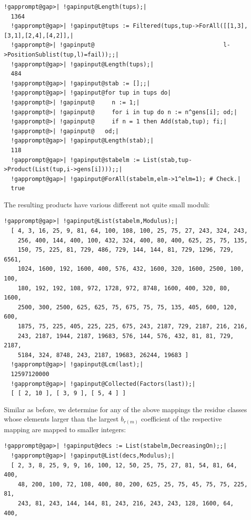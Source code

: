 \documentclass[a4paper,11pt]{report}
\begin{document}
{{\begin{Verbatim}[commandchars=!@|,fontsize=\small,frame=single,label=Example]
  !gapprompt@gap>| !gapinput@Length(tups);|
  1364
  !gapprompt@gap>| !gapinput@tups := Filtered(tups,tup->ForAll([[1,3],[3,1],[2,4],[4,2]],|
  !gapprompt@>| !gapinput@                                     l->PositionSublist(tup,l)=fail));;|
  !gapprompt@gap>| !gapinput@Length(tups);|
  484
  !gapprompt@gap>| !gapinput@stab := [];;|
  !gapprompt@gap>| !gapinput@for tup in tups do|
  !gapprompt@>| !gapinput@     n := 1;|
  !gapprompt@>| !gapinput@     for i in tup do n := n^gens[i]; od;|
  !gapprompt@>| !gapinput@     if n = 1 then Add(stab,tup); fi;|
  !gapprompt@>| !gapinput@   od;|
  !gapprompt@gap>| !gapinput@Length(stab);|
  118
  !gapprompt@gap>| !gapinput@stabelm := List(stab,tup->Product(List(tup,i->gens[i])));;|
  !gapprompt@gap>| !gapinput@ForAll(stabelm,elm->1^elm=1); # Check.|
  true
\end{Verbatim}
 The resulting products have various different not quite small moduli: 
\begin{Verbatim}[commandchars=!@|,fontsize=\small,frame=single,label=Example]
  !gapprompt@gap>| !gapinput@List(stabelm,Modulus);|
  [ 4, 3, 16, 25, 9, 81, 64, 100, 108, 100, 25, 75, 27, 243, 324, 243, 
    256, 400, 144, 400, 100, 432, 324, 400, 80, 400, 625, 25, 75, 135, 
    150, 75, 225, 81, 729, 486, 729, 144, 144, 81, 729, 1296, 729, 6561, 
    1024, 1600, 192, 1600, 400, 576, 432, 1600, 320, 1600, 2500, 100, 100, 
    180, 192, 192, 108, 972, 1728, 972, 8748, 1600, 400, 320, 80, 1600, 
    2500, 300, 2500, 625, 625, 75, 675, 75, 75, 135, 405, 600, 120, 600, 
    1875, 75, 225, 405, 225, 225, 675, 243, 2187, 729, 2187, 216, 216, 
    243, 2187, 1944, 2187, 19683, 576, 144, 576, 432, 81, 81, 729, 2187, 
    5184, 324, 8748, 243, 2187, 19683, 26244, 19683 ]
  !gapprompt@gap>| !gapinput@Lcm(last);|
  12597120000
  !gapprompt@gap>| !gapinput@Collected(Factors(last));|
  [ [ 2, 10 ], [ 3, 9 ], [ 5, 4 ] ]
\end{Verbatim}
 Similar as before, we determine for any of the above mappings the residue
classes whose elements larger than the largest $b_{r(m)}$ \texttt{} coefficient of the respective mapping are mapped to
smaller integers: 
\begin{Verbatim}[commandchars=!@|,fontsize=\small,frame=single,label=Example]
  !gapprompt@gap>| !gapinput@decs := List(stabelm,DecreasingOn);;|
  !gapprompt@gap>| !gapinput@List(decs,Modulus);|
  [ 2, 3, 8, 25, 9, 9, 16, 100, 12, 50, 25, 75, 27, 81, 54, 81, 64, 400, 
    48, 200, 100, 72, 108, 400, 80, 200, 625, 25, 75, 45, 75, 75, 225, 81, 
    243, 81, 243, 144, 144, 81, 243, 216, 243, 243, 128, 1600, 64, 400, 

\end{Verbatim}}}
\end{document}
